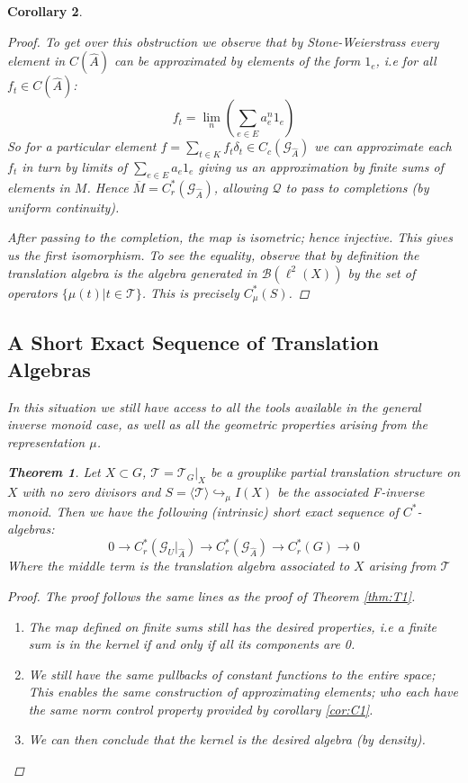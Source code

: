 \documentclass[11pt]{amsart}
\theoremstyle{plain}
\newtheorem{theorem}{Theorem}%
\newtheorem{corollary}[theorem]{Corollary}%
\theoremstyle{definition}%
\theoremstyle{remark}%
\newcommand{\G}{\mathcal{G}}
\newcommand{\A}{\widehat{A}}
\begin{document}
\begin{corollary}
\begin{proof}
To get over this obstruction we observe that by Stone-Weierstrass every element in $C(\A)$ can be approximated by elements of the form $1_{e}$, i.e for all $f_{t} \in C(\A)$:
\begin{equation*}
f_{t} = \lim_{n} (\sum_{e \in E} a^{n}_{e}1_{e})
\end{equation*}
So for a particular element  $f=\sum_{t \in K}f_{t}\delta_{t} \in C_{c}(\G_{\A})$ we can approximate each $f_{t}$ in turn by limits of $\sum_{e \in E} a_{e}1_{e}$ giving us an approximation by finite sums of elements in $M$. Hence $\overline{M} = C^{*}_{r}(\G_{\A})$, allowing $\mathcal{Q}$ to pass to completions (by uniform continuity).

After passing to the completion, the map is isometric; hence injective. This gives us the first isomorphism. To see the equality, observe that by definition the translation algebra is the algebra generated in $\mathcal{B}(\ell^{2}(X))$ by the set of operators $\lbrace \mu(t) | t \in \mathcal{T} \rbrace$. This is precisely $C^{*}_{\mu}(S)$.
\end{proof}

\subsection{A Short Exact Sequence of Translation Algebras}

In this situation we still have access to all the tools available in the general inverse monoid case, as well as all the geometric properties arising from the representation $\mu$.

\begin{theorem}\label{thm:T4}
Let $X \subset G$, $\mathcal{T}=\mathcal{T}_{G}|_{X}$ be a grouplike partial translation structure on $X$ with no zero divisors and $S=\langle \mathcal{T} \rangle \hookrightarrow_{\mu} I(X)$ be the associated F-inverse monoid. Then we have the following (intrinsic) short exact sequence of $C^{*}$-algebras:
\begin{equation}\label{eqn1}
0 \rightarrow C^{*}_{r}(\G_{U}|_{\A}) \rightarrow C^{*}_{r}(\G_{\A}) \rightarrow C^{*}_{r}(G) \rightarrow 0
\end{equation}
Where the middle term is the translation algebra associated to $X$ arising from $\mathcal{T}$
\end{theorem}
\begin{proof}
The proof follows the same lines as the proof of Theorem \ref{thm:T1}.
\begin{enumerate}
\item The map defined on finite sums still has the desired properties, i.e a finite sum is in the kernel if and only if all its components are 0.
\item We still have the same pullbacks of constant functions to the entire space; This enables the same construction of approximating elements; who each have the same norm control property provided by corollary \ref{cor:C1}.
\item We can then conclude that the kernel is the desired algebra (by density).
\end{enumerate}
\end{proof}


\end{corollary}
\end{document}
